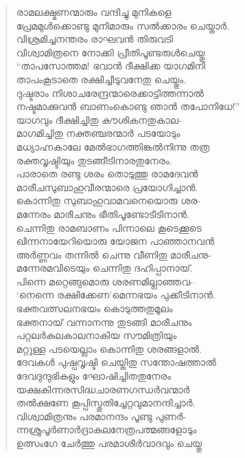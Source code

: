 \begin{verse}
രാമലക്ഷ്മണന്മാരും വന്ദിച്ചു മുനികളെ\\
പ്രേമമുള്‍ക്കൊണ്ടു മുനിമാരും സല്‍ക്കാരം ചെയ്താര്‍.\\
വിശ്രമിച്ചനന്തരം രാഘവന്‍ തിരുവടി\\
വിശ്വാമിത്രനെ നോക്കി പ്രീതിപൂണ്ടരുള്‍ചെയ്തു\\
“താപസോത്തമ! ഭവാന്‍ ദീക്ഷിക്ക യാഗമിനി\\
താപംകൂടാതെ രക്ഷിച്ചീടുവനേതു ചെയ്തും.\\
ദുഷ്ടരാം നിശാചരേന്ദ്രന്മാരെക്കാട്ടിത്തന്നാല്‍\\
നഷ്ടമാക്കുവന്‍ ബാണംകൊണ്ടു ഞാന്‍ തപോനിധേ!”\\
യാഗവും ദീക്ഷിച്ചിതു കൗശികനതുകാല-\\
മാഗമിച്ചിതു നക്തഞ്ചരന്മാര്‍ പടയോടും\\
മധ്യാഹ്നകാലേ മേല്‍ഭാഗത്തിങ്കല്‍നിന്നു തത്ര\\
രക്തവൃഷ്ടിയും തുടങ്ങീടിനാരതുനേരം.\\
പാരാതെ രണ്ടു ശരം തൊടുത്തു രാമദേവന്‍\\
മാരീചസുബാഹുവീരന്മാരെ പ്രയോഗിച്ചാന്‍.\\
കൊന്നിതു സുബാഹുവാമവനെയൊരു ശര-\\
മന്നേരം മാരീചനും ഭീതിപൂണ്ടോടീടിനാന്‍.\\
ചെന്നിതു രാമബാണം പിന്നാലെ കൂടെക്കൂടെ\\
ഖിന്നനായേറിയൊരു യോജന പാഞ്ഞാനവന്‍\\
അര്‍ണ്ണവം തന്നില്‍ ചെന്നു വീണിതു മാരീചനു-\\
മന്നേരമവിടെയും ചെന്നിതു ദഹിപ്പാനായ്.\\
പിന്നെ മറ്റെങ്ങുമൊരു ശരണമില്ലാഞ്ഞവ-\\
‘നെന്നെ രക്ഷിക്കേണ’മെന്നഭയം പുക്കീടിനാന്‍.\\
ഭക്തവത്സലനഭയം കൊടുത്തതുമൂലം\\
ഭക്തനായ് വന്നാനന്നു തുടങ്ങി മാരീചനും\\
പറ്റലര്‍കുലകാലനാകിയ സൗമിത്രിയും\\
മറ്റുള്ള പടയെല്ലാം കൊന്നിതു ശരങ്ങളാല്‍.\\
ദേവകള്‍ പുഷ്പവൃഷ്ടി ചെയ്തിതു സന്തോഷത്താല്‍\\
ദേവദുന്ദുഭികളും ഘോഷിച്ചിതതുനേരം\\
യക്ഷകിന്നരസിദ്ധചാരണഗന്ധര്‍വന്മാര്‍\\
തല്‍ക്ഷണേ കൂപ്പിസ്തുതിച്ചേറ്റവുമാനന്ദിച്ചാര്‍.\\
വിശ്വാമിത്രനും പരമാനന്ദം പൂണ്ടു പുണര്‍-\\
ന്നശ്രുപൂര്‍ണാര്‍ദ്രാകുലനേത്രപത്മങ്ങളോടും\\
ഉത്സംഗേ ചേര്‍ത്തു പരമാശീര്‍വാദവും ചെയ്തു\\

\end{verse}
